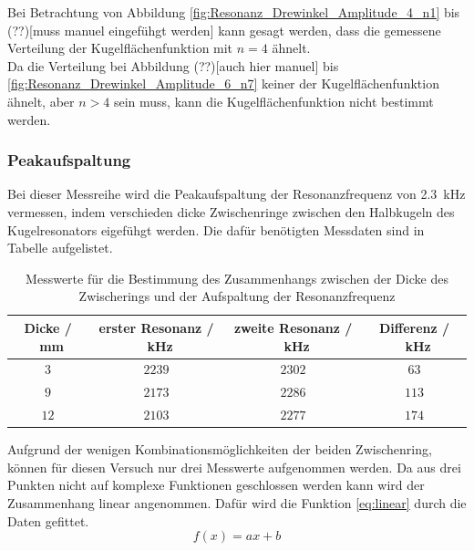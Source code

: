 \FloatBarrier
Bei Betrachtung von Abbildung \ref{fig:Resonanz_Drewinkel_Amplitude_4_n1} bis (??)[muss manuel eingefühgt werden] kann gesagt werden, 
dass die gemessene Verteilung der Kugelflächenfunktion mit $n=4$ ähnelt. \\
Da die Verteilung bei Abbildung (??)[auch hier manuel] bis \ref{fig:Resonanz_Drewinkel_Amplitude_6_n7}  keiner der Kugelflächenfunktion ähnelt, aber
$n>4$ sein muss, kann die Kugelflächenfunktion nicht bestimmt werden.
\subsubsection{Peakaufspaltung}
Bei dieser Messreihe wird die Peakaufspaltung der Resonanzfrequenz von \SI{2.3}{\kilo\hertz} vermessen, indem verschieden dicke 
Zwischenringe zwischen den Halbkugeln des Kugelresonators eigefühgt werden.
Die dafür benötigten Messdaten sind in Tabelle  aufgelistet.
\FloatBarrier
\begin{table}
    \centering
    \caption{Messwerte für die Bestimmung des Zusammenhangs zwischen der Dicke des Zwischerings und der Aufspaltung der Resonanzfrequenz}
    \begin{tabular}{c c c c}
        \toprule
        Dicke / \SI{}{\milli\meter}& erster Resonanz / \SI{}{\kilo\hertz}& zweite Resonanz / \SI{}{\kilo\hertz}& Differenz / \SI{}{\kilo\hertz}\\
        \midrule
        $\num{3}$ &$\num{2239}$&$\num{2302}$&$\num{63}$\\
        $\num{9}$ &$\num{2173}$&$\num{2286}$&$\num{113}$\\
        $\num{12}$&$\num{2103}$&$\num{2277}$&$\num{174}$\\
        \bottomrule
    \end{tabular}
\end{table}
\FloatBarrier
Aufgrund der wenigen Kombinationsmöglichkeiten der beiden Zwischenring, können für diesen Versuch nur drei Messwerte aufgenommen werden.
Da aus drei Punkten nicht auf komplexe Funktionen geschlossen werden kann wird der Zusammenhang linear angenommen.
Dafür wird die Funktion \eqref{eq:linear} durch die Daten gefittet.
\begin{equation}
    f\left(x\right) = ax +b
    \label{eq:linear}
\end{equation}
\FloatBarrier
